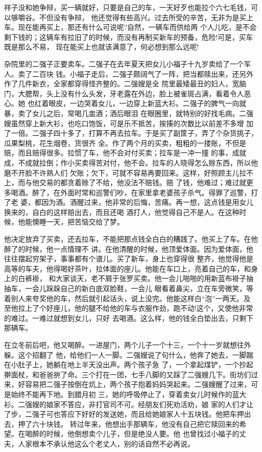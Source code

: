 \documentclass[11pt,a4paper,onecolumn]{article}
\begin{document}
祥子没和她争辩，买一辆就好，只要是自己的车，一天好歹也能拉个六七毛钱，可以够嚼谷。不但没有争辩，
他还觉得有些高兴。过去所受的辛苦，无非为是买上车。现在能再买上，那还有什么可说呢?自然，一辆车而供给两
个人儿吃，是不会剩下钱的；这辆车有拉旧了的时候，而没有再制买新车的预备，危险!可是，买车既是那么不易，
现在能买上也就该满意了，何必想到那么远呢!

杂院里的二强子正要卖车。二强子在去年夏天把女儿小福子\myrule 十九岁\myrule 卖给了一个军人。卖了二百块
钱。小福子走后，二强子颇阔气了一阵，把当都赎出来，还另外作了几件新衣，全家都穿得怪齐整的。二强嫂是全
院里最矮最丑的妇人，宽脑门，大腮帮，头上没有什么头发，牙老露在外边，脸上被雀斑占满，看着令人恶心。她
也红着眼皮，一边哭着女儿，一边穿上新蓝大衫。二强子的脾气一向就暴，卖了女儿之后，常喝几盅酒；酒后眼泪
在眼圈里，就特别的好找毛病。二强嫂虽然穿上新大衫，也吃口饱饭，可是乐不抵苦，挨揍的次数比以前差不多增
加了一倍。二强子四十多了，打算不再去拉车。于是买了副筐子，弄了个杂货挑子，瓜果梨桃，花生烟卷，货很齐
全。作了两个月的买卖，粗粗的一搂账，不但是赔，而且赔得很多。拉惯了车，他不会对付买卖；拉车是一冲一撞
的事，成就成，不成就拉倒；作小买卖得苦对付，他不会。拉车的人晓得怎么赊东西，所以他磨不开脸不许熟人们
欠账；欠下，可就不容易再要回来。这样，好照顾主儿拉不上，而与他交易的都贪着赊了不给，他没法不赔钱。赔
了钱，他难过；难过就更多喝酒。醉了，在外面时常和巡警们吵，在家里拿老婆孩子杀气。得罪了巡警，打了老
婆，都因为酒。酒醒过来，他非常的后悔，苦痛。再一想，这点钱是用女儿换来的，自白的这样赔出去，而且还喝
酒打人，他觉得自己不是人。在这种时候，他能懊睡一天，把苦恼交给了梦。

他决定放弃了买卖，还去拉车，不能把那点钱全白白的糟践了。他买上了车。在他醉了的时候，他一点情理不
讲。在他清醒的时候，他顶爱体面。因为爱体面，他往往摆起穷架子，事事都有个谱儿。买了新车，身上也穿得很
整齐，他觉得他是高等的车夫，他得喝好茶叶，拉体面的座儿。他能在车口上，亮着自己的车，和身上的白裤褂，
和大家谈天，老不屑于张罗买卖。他一会儿啪啪的用新蓝布褂子抽抽车，一会儿跺跺自己的新白底双脸鞋，一会儿
眼看着鼻尖，立在车旁微笑，等着别人来夸奖他的车，然后就引起话头，说上没完。他能这样白``泡''一两天。及
至他拉上了个好座儿，他的腿不给他的车与衣服作劲，跑不动!这个，又使他非常的难过。一难过就想到女儿，只好
去喝酒。这么样，他的钱全白垫出去，只剩下那辆车。

在立冬前后吧，他又喝醉。一进屋门，两个儿子\myrule 一个十三，一个十一岁\myrule 就想往外躲。这个招翻了
他，给他们一人一脚。二强嫂说了句什么，他奔了她去，一脚踹在小肚子上，她躺在地上半天没出声。两个孩子急
了，一个拿起煤铲，一个抄起擀面杖，和爸爸拚了命。三个打在一团，七手八脚的又踩了二强嫂几下。街坊们过
来，好容易把二强子按倒在炕上，两个孩子抱着妈妈哭起来。二强嫂醒了过来，可是始终不能再下地。到腊月初
三，她的呼吸停止了，穿着卖女儿时候作的蓝大衫。二强嫂的娘家不答应，非打官司不可。经朋友们死劝活劝，娘
家的人们才让了步，二强子可也答应下好好的发送她，而且给她娘家人十五块钱。他把车押出去，押了六十块钱。
转过年来，他想出手那辆车，他没有自己把它赎回来的希望。在喝醉的时候，他倒想卖个儿子，但是绝没人要。他
也曾找过小福子的丈夫，人家根本不承认他这么个老丈人，别的话自然不必再说。
\end{document}
